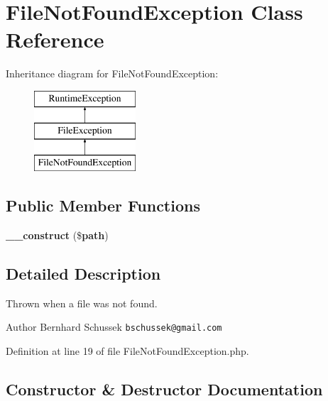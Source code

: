 \section{File\+Not\+Found\+Exception Class Reference}
\label{class_symfony_1_1_component_1_1_http_foundation_1_1_file_1_1_exception_1_1_file_not_found_exception}
Inheritance diagram for File\+Not\+Found\+Exception\+:\begin{figure}[H]
\begin{center}
\leavevmode
\includegraphics[height=3.000000cm]{class_symfony_1_1_component_1_1_http_foundation_1_1_file_1_1_exception_1_1_file_not_found_exception}
\end{center}
\end{figure}
\subsection*{Public Member Functions}
\begin{DoxyCompactItemize}
\item 
{\bf \+\_\+\+\_\+construct} (\${\bf path})
\end{DoxyCompactItemize}


\subsection{Detailed Description}
Thrown when a file was not found.

\begin{DoxyAuthor}{Author}
Bernhard Schussek {\tt bschussek@gmail.\+com} 
\end{DoxyAuthor}


Definition at line 19 of file File\+Not\+Found\+Exception.\+php.



\subsection{Constructor \& Destructor Documentation}
